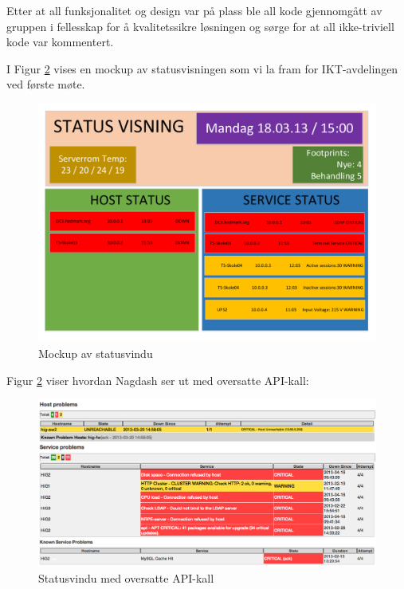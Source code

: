 Etter at all funksjonalitet og design var på plass ble all kode gjennomgått av gruppen i fellesskap for å kvalitetssikre løsningen og sørge for at all ikke-triviell kode var kommentert.

I Figur \ref{statusvindu_mockup} vises en mockup av statusvisningen som vi la fram for IKT-avdelingen ved første møte.

\begin{figure}[H]
    \centering
    \includegraphics[scale=0.3]{img/statusvindu_mockup}
    \caption{Mockup av statusvindu}
    \label{statusvindu_mockup}
\end{figure}

Figur \ref{statusvindu_mockup} viser hvordan Nagdash ser ut med oversatte API-kall:

\begin{figure}[H]
    \centering
    \includegraphics[scale=0.3]{img/statusvindu_oversatte_kall}
    \caption{Statusvindu med oversatte API-kall}
    \label{statusvindu_mockup}
\end{figure}


